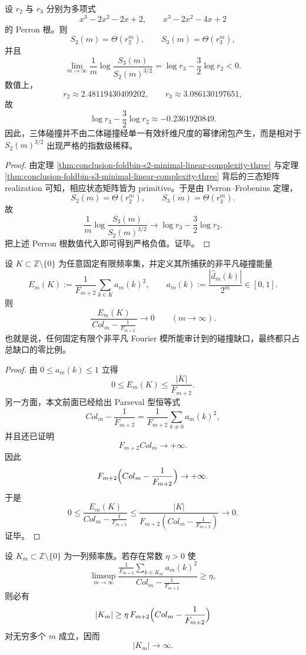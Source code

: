 \begin{corollary}[三体碰撞相对于二体碰撞的指数级次单形稀释]\label{cor:conclusion-foldbin-s3-vs-s2-threehalves-exponential-dilution}
设 \(r_2\) 与 \(r_3\) 分别为多项式
\[
x^3-2x^2-2x+2,
\qquad
x^3-2x^2-4x+2
\]
的 Perron 根。则
\[
S_2(m)=\Theta(r_2^m),
\qquad
S_3(m)=\Theta(r_3^m),
\]
并且
\[
\lim_{m\to\infty}\frac1m\log\frac{S_3(m)}{S_2(m)^{3/2}}
=
\log r_3-\frac32\log r_2
<0.
\]
数值上，
\[
r_2\approx 2.48119430409202,
\qquad
r_3\approx 3.086130197651,
\]
故
\[
\log r_3-\frac32\log r_2\approx -0.2361920849.
\]
因此，三体碰撞并不由二体碰撞经单一有效纤维尺度的幂律闭包产生，而是相对于 \(S_2(m)^{3/2}\) 出现严格的指数级稀释。
\end{corollary}

\begin{proof}
由定理 \ref{thm:conclusion-foldbin-s2-minimal-linear-complexity-three} 与定理 \ref{thm:conclusion-foldbin-s3-minimal-linear-complexity-three} 背后的三态矩阵 realization 可知，相应状态矩阵皆为 primitive。于是由 Perron--Frobenius 定理，
\[
S_2(m)=\Theta(r_2^m),
\qquad
S_3(m)=\Theta(r_3^m).
\]
故
\[
\frac1m\log\frac{S_3(m)}{S_2(m)^{3/2}}
\longrightarrow
\log r_3-\frac32\log r_2.
\]
把上述 Perron 根数值代入即可得到严格负值。证毕。
\end{proof}

\begin{theorem}\label{thm:conclusion-foldbin-fixed-finite-fourier-audit-vanishing-share}
设 \(K\subset \mathbb Z\setminus\{0\}\) 为任意固定有限频率集，并定义其所捕获的非平凡碰撞能量
\[
E_m(K):=\frac1{F_{m+2}}\sum_{k\in K}a_m(k)^2,
\qquad
a_m(k):=\frac{|\widehat d_m(k)|}{2^m}\in[0,1].
\]
则
\[
\frac{E_m(K)}{\,Col_m-\frac1{F_{m+2}}\,}\longrightarrow 0
\qquad (m\to\infty).
\]
也就是说，任何固定有限个非平凡 Fourier 模所能审计到的碰撞缺口，最终都只占总缺口的零比例。
\end{theorem}

\begin{proof}
由 \(0\le a_m(k)\le 1\) 立得
\[
0\le E_m(K)\le \frac{|K|}{F_{m+2}}.
\]
另一方面，本文前面已经给出 Parseval 型恒等式
\[
Col_m-\frac1{F_{m+2}}
=
\frac1{F_{m+2}}\sum_{k\ne 0}a_m(k)^2,
\]
并且还已证明
\[
F_{m+2}Col_m\to+\infty.
\]
因此
\[
F_{m+2}\Bigl(Col_m-\frac1{F_{m+2}}\Bigr)\to+\infty.
\]
于是
\[
0\le
\frac{E_m(K)}{Col_m-\frac1{F_{m+2}}}
\le
\frac{|K|}{F_{m+2}\left(Col_m-\frac1{F_{m+2}}\right)}
\longrightarrow 0.
\]
证毕。
\end{proof}

\begin{corollary}[任何渐近充分的频谱证书都必须无界增宽]\label{cor:conclusion-foldbin-sufficient-spectral-certificate-must-widen}
设 \(K_m\subset \mathbb Z\setminus\{0\}\) 为一列频率族。若存在常数 \(\eta>0\) 使
\[
\limsup_{m\to\infty}
\frac{\frac1{F_{m+2}}\sum_{k\in K_m}a_m(k)^2}
{Col_m-\frac1{F_{m+2}}}
\ge \eta,
\]
则必有
\[
|K_m|
\ge
\eta\,F_{m+2}\Bigl(Col_m-\frac1{F_{m+2}}\Bigr)
\]
对无穷多个 \(m\) 成立，因而
\[
|K_m|\to\infty.
\]
\end{corollary}

